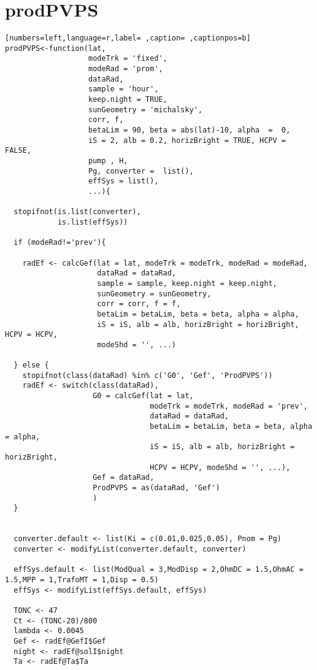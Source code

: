 \section{prodPVPS}
\label{sec:org70b482c}
\begin{lstlisting}[numbers=left,language=r,label= ,caption= ,captionpos=b]
prodPVPS<-function(lat, 
                   modeTrk = 'fixed', 
                   modeRad = 'prom', 
                   dataRad,
                   sample = 'hour',
                   keep.night = TRUE,
                   sunGeometry = 'michalsky',
                   corr, f,
                   betaLim = 90, beta = abs(lat)-10, alpha  =  0,
                   iS = 2, alb = 0.2, horizBright = TRUE, HCPV = FALSE,
                   pump , H, 
                   Pg, converter =  list(), 
                   effSys = list(),
                   ...){
  
  stopifnot(is.list(converter),
            is.list(effSys))
  
  if (modeRad!='prev'){ 
    
    radEf <- calcGef(lat = lat, modeTrk = modeTrk, modeRad = modeRad,
                     dataRad = dataRad,
                     sample = sample, keep.night = keep.night,
                     sunGeometry = sunGeometry,
                     corr = corr, f = f,
                     betaLim = betaLim, beta = beta, alpha = alpha,
                     iS = iS, alb = alb, horizBright = horizBright, HCPV = HCPV,
                     modeShd = '', ...)
    
  } else {
    stopifnot(class(dataRad) %in% c('G0', 'Gef', 'ProdPVPS'))
    radEf <- switch(class(dataRad),
                    G0 = calcGef(lat = lat, 
                                 modeTrk = modeTrk, modeRad = 'prev',
                                 dataRad = dataRad,
                                 betaLim = betaLim, beta = beta, alpha = alpha,
                                 iS = iS, alb = alb, horizBright = horizBright,
                                 HCPV = HCPV, modeShd = '', ...),
                    Gef = dataRad,
                    ProdPVPS = as(dataRad, 'Gef')
                    )
  }
  

  converter.default <- list(Ki = c(0.01,0.025,0.05), Pnom = Pg)
  converter <- modifyList(converter.default, converter)
  
  effSys.default <- list(ModQual = 3,ModDisp = 2,OhmDC = 1.5,OhmAC = 1.5,MPP = 1,TrafoMT = 1,Disp = 0.5)
  effSys <- modifyList(effSys.default, effSys)
  
  TONC <- 47
  Ct <- (TONC-20)/800
  lambda <- 0.0045
  Gef <- radEf@GefI$Gef
  night <- radEf@solI$night
  Ta <- radEf@Ta$Ta
  

\end{lstlisting}
